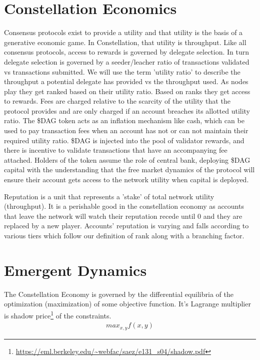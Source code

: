 \documentclass{article}
\begin{document}
\section{Constellation Economics}
Consensus protocols exist to provide a utility and that utility is the basis of a generative economic game. In Constellation, that utility is throughput. Like all consensus protocols, access to rewards is governed by delegate selection. In turn delegate selection is governed by a seeder/leacher ratio of transactions validated vs transactions submitted. We will use the term 'utility ratio' to describe the throughput a potential delegate has provided vs the throughput used. As nodes play they get ranked based on their utility ratio. Based on ranks they get access to rewards. Fees are charged relative to the scarcity of the utility that the protocol provides and are only charged if an account breaches its allotted utility ratio. The \$DAG token acts as an inflation mechanism like cash, which can be used to pay transaction fees when an account has not or can not maintain their required utility ratio. \$DAG is injected into the pool of validator rewards, and there is incentive to validate transactions that have an accompanying fee attached. Holders of the token assume the role of central bank, deploying \$DAG capital with the understanding that the free market dynamics of the protocol will ensure their account gets access to the network utility when capital is deployed. 

Reputation is a unit that represents a 'stake' of total network utility (throughput). It is a perishable good in the constellation economy as accounts that leave the network will watch their reputation recede until 0 and they are replaced by a new player. Accounts' reputation is varying and falls according to various tiers which follow our definition of rank along with a branching factor.

\section{Emergent Dynamics}
The Constellation Economy is governed by the differential equilibria of the optimization (maximization) of some objective function. It's Lagrange multiplier is shadow price\footnote{\url{https://eml.berkeley.edu/~webfac/saez/e131_s04/shadow.pdf}} of the constraints.
\begin{equation} \label{eq1}
\begin{split}
max_{x, y} f(x, y)
\end{split}
\end{equation}
\end{document}
